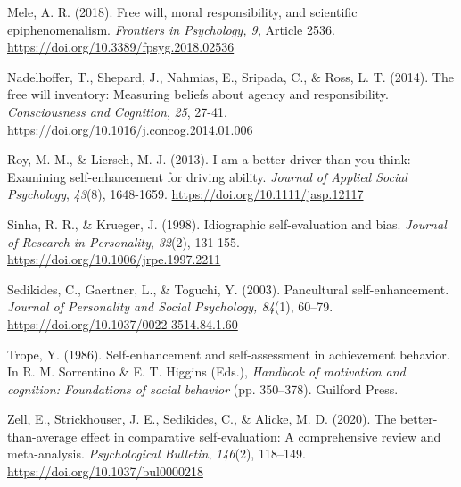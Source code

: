 \documentclass[authordate, anecdote]{jote-new-article}
\begin{document}
	Mele, A. R. (2018). Free will, moral responsibility, and scientific epiphenomenalism. \emph{Frontiers in Psychology, 9,} Article 2536. \href{https://doi.org/10.3389/fpsyg.2018.02536}{https://doi.org/10.3389/fpsyg.2018.02536}



	Nadelhoffer, T., Shepard, J., Nahmias, E., Sripada, C., \& Ross, L. T. (2014). The free will inventory: Measuring beliefs about agency and responsibility. \emph{Consciousness and Cognition}, \emph{25}, 27-41. \href{https://doi.org/10.1016/j.concog.2014.01.006}{https://doi.org/10.1016/j.concog.2014.01.006}



	Roy, M. M., \& Liersch, M. J. (2013). I am a better driver than you think: Examining self-enhancement for driving ability. \emph{Journal of Applied Social Psychology}, \emph{43}(8), 1648-1659. \href{https://doi.org/10.1111/jasp.12117}{https://doi.org/10.1111/jasp.12117}



	Sinha, R. R., \& Krueger, J. (1998). Idiographic self-evaluation and bias. \emph{Journal of Research in Personality}, \emph{32}(2), 131-155. \href{https://doi.org/10.1006/jrpe.1997.2211}{https://doi.org/10.1006/jrpe.1997.2211}



	Sedikides, C., Gaertner, L., \& Toguchi, Y. (2003). Pancultural self-enhancement. \emph{Journal of Personality and Social Psychology, 84}(1), 60--79. \href{https://doi.org/10.1037/0022-3514.84.1.60}{https://doi.org/10.1037/0022-3514.84.1.60}



	Trope, Y. (1986). Self-enhancement and self-assessment in achievement behavior. In R. M. Sorrentino \& E. T. Higgins (Eds.), \emph{Handbook of motivation and cognition: Foundations of social behavior} (pp. 350--378). Guilford Press.



	Zell, E., Strickhouser, J. E., Sedikides, C., \& Alicke, M. D. (2020). The better-than-average effect in comparative self-evaluation: A comprehensive review and meta-analysis. \emph{Psychological Bulletin}, \emph{146}(2), 118--149. \href{https://doi.org/10.1037/bul0000218}{https://doi.org/10.1037/bul0000218}
\end{document}
